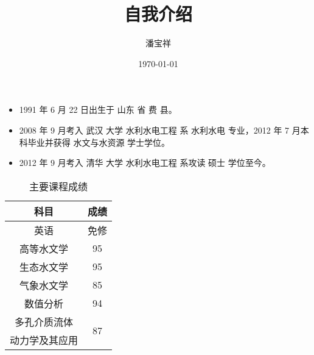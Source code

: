 \documentclass{article}
\begin{document}
\begin{CJK}{UTF8}{gkai}
\title{自我介绍}
\date{\today}
\author{潘宝祥}
\maketitle

\begin{itemize}
\item 1991 年 6 月 22 日出生于 山东 省 费 县。
\item 2008 年 9 月考入 武汉 大学 水利水电工程 系 水利水电 专业，2012 年 7 月本科毕业并获得 水文与水资源 学士学位。
\item 2012 年 9 月考入 清华 大学 水利水电工程 系攻读 硕士 学位至今。
\end{itemize}

\begin{table*}[H] 
\caption{主要课程成绩}
 
\centering
\begin{tabular}{cc}
\hline 
科目&成绩\\
\hline 
英语&免修\\
高等水文学&95\\
生态水文学&95\\
气象水文学&85\\
数值分析&94\\
多孔介质流体&\multirow{2}{*}{87}\\
动力学及其应用&\\
\hline 
\end{tabular}
 
\end{table*}



\end{CJK} 
\end{document}
